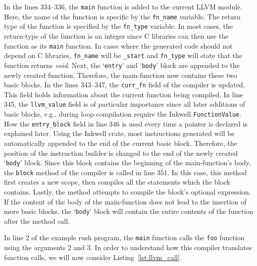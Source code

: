 In the lines 334--336, the \texttt{main} function is added to the current LLVM module.
Here, the name of the function is specific by the \texttt{fn\_name} variable.
The return type of the function is specified by the \texttt{fn\_type} variable.
In most cases, the return-type of the function is an integer since C libraries can then use the function as its \texttt{main} function.
In cases where the generated code should not depend on C libraries, \Verb|fn_name| will be \Verb|_start| and \Verb|fn_type| will state that the function returns \emph{void}.
Next, the `\texttt{entry}' and `\texttt{body}' block are appended to the newly created function.
Therefore, the main-function now contains these two basic blocks.
In the lines 343--347, the \Verb|curr_fn| field of the compiler is updated.
This field holds information about the current function being compiled.
In line 345, the \Verb|llvm_value| field is of particular importance since all later additions of basic blocks, e.g., during loop compilation require the Inkwell \texttt{FunctionValue}.
How the \Verb|entry_block| field in line 346 is used every time a pointer is declared is explained later.
Using the Inkwell crate, most instructions generated will be automatically appended to the end of the current basic block.
Therefore, the position of the instruction builder is changed to the end of the newly created `\texttt{body}' block.
Since this block contains the beginning of the main-function's body, the \texttt{block} method of the compiler is called in line 351.
In this case, this method first creates a new scope, then compiles all the statements which the block contains.
Lastly, the method attempts to compile the block's optional expression.
If the content of the body of the main-function does not lead to the insertion of more basic blocks,
the `\texttt{body}' block will contain the entire contents of the function after the method call.

In line 2 of the example rush program, the \texttt{main} function calls the \texttt{foo} function using the arguments 2 and 3.
In order to understand how this compiler translates function calls, we will now consider Listing~\ref{lst:llvm_call}.


